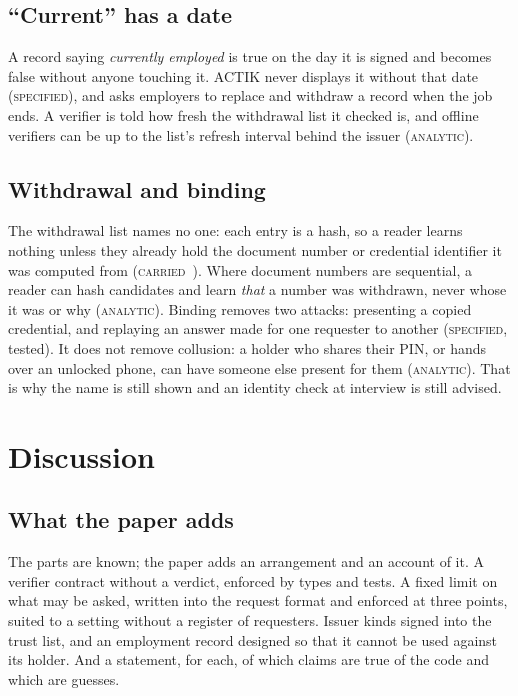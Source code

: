 \documentclass[10pt,a4paper,twocolumn]{article}
\newcommand{\kind}[1]{\textsc{#1}}
\begin{document}
\subsection{``Current'' has a date}

A record saying \emph{currently employed} is true on the day it is signed and
becomes false without anyone touching it. ACTIK never displays it without that
date (\kind{specified}), and asks employers to replace and withdraw a record when
the job ends. A verifier is told how fresh the withdrawal list it checked is, and
offline verifiers can be up to the list's refresh interval behind the issuer
(\kind{analytic}).

\subsection{Withdrawal and binding}

The withdrawal list names no one: each entry is a hash, so a reader learns
nothing unless they already hold the document number or credential identifier it
was computed from (\kind{carried}~\citep{chay2026qrseal}). Where document numbers
are sequential, a reader can hash candidates and learn \emph{that} a number was
withdrawn, never whose it was or why (\kind{analytic}). Binding removes two
attacks: presenting a copied credential, and replaying an answer made for one
requester to another (\kind{specified}, tested). It does not remove collusion: a
holder who shares their PIN, or hands over an unlocked phone, can have someone
else present for them (\kind{analytic}). That is why the name is still shown and
an identity check at interview is still advised.

\section{Discussion}
\label{sec:discussion}

\subsection{What the paper adds}

The parts are known; the paper adds an arrangement and an account of it. A
verifier contract without a verdict, enforced by types and tests. A fixed limit
on what may be asked, written into the request format and enforced at three
points, suited to a setting without a register of requesters. Issuer kinds signed
into the trust list, and an employment record designed so that it cannot be used
against its holder. And a statement, for each, of which claims are true of the
code and which are guesses.
\end{document}
